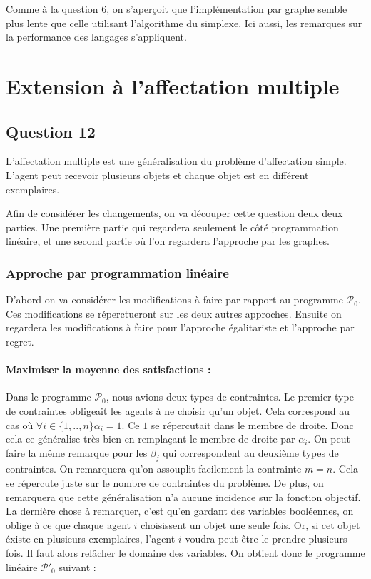 \documentclass[a4paper, titlepage, oneside, 12pt]{article}%
\begin{document}
Comme à la question $6$, on s'aperçoit que l'implémentation par graphe semble plus lente que celle utilisant l'algorithme du simplexe. Ici aussi, les remarques sur la performance des langages s'appliquent.
\section{Extension à l'affectation multiple}

\subsection{Question 12}

L'affectation multiple est une généralisation du problème d'affectation simple. L'agent peut recevoir plusieurs objets et chaque objet est en différent exemplaires.

Afin de considérer les changements, on va découper cette question deux deux parties. Une première partie qui regardera seulement le côté programmation linéaire, et une second partie où l'on regardera l'approche par les graphes.

\subsubsection{Approche par programmation linéaire}

D'abord on va considérer les modifications à faire par rapport au programme $\mathcal{P}_0$. Ces modifications se réperctueront sur les deux autres approches. Ensuite on regardera les modifications à faire pour l'approche égalitariste et l'approche par regret.

\paragraph{Maximiser la moyenne des satisfactions : }

Dans le programme $\mathcal{P}_0$, nous avions deux types de contraintes. Le premier type de contraintes obligeait les agents à ne choisir qu'un objet. Cela correspond au cas où $\forall i \in \{1,..,n\} \alpha_i =1$. Ce $1$ se répercutait dans le membre de droite. Donc cela ce généralise très bien en remplaçant le membre de droite par $\alpha_i$. On peut faire la même remarque pour les $\beta_j$ qui correspondent au deuxième types de contraintes. On remarquera qu'on assouplit facilement la contrainte $m=n$. Cela se répercute juste sur le nombre de contraintes du problème. De plus, on remarquera que cette généralisation n'a aucune incidence sur la fonction objectif. La dernière chose à remarquer, c'est qu'en gardant des variables booléennes, on oblige à ce que chaque agent $i$ choisissent un objet une seule fois. Or, si cet objet éxiste en plusieurs exemplaires, l'agent $i$ voudra peut-être le prendre plusieurs fois. Il faut alors relâcher le domaine des variables. On obtient donc le programme linéaire $\mathcal{P'}_0$ suivant :
\end{document}
